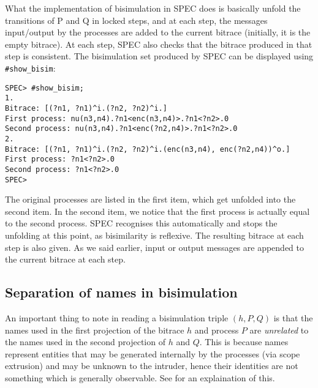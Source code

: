 \documentclass{article}
\begin{document}
What the implementation of bisimulation in SPEC does is basically
unfold the transitions of P and Q in locked steps, and at each step, the 
messages input/output by the processes are added to the current bitrace (initially,
it is the empty bitrace). At each step, SPEC also checks that the bitrace produced
in that step is consistent. 
The bisimulation set produced by SPEC can be displayed using \texttt{\#show\_bisim}:
\begin{verbatim}
SPEC> #show_bisim;
1. 
Bitrace: [(?n1, ?n1)^i.(?n2, ?n2)^i.]
First process: nu(n3,n4).?n1<enc(n3,n4)>.?n1<?n2>.0
Second process: nu(n3,n4).?n1<enc(?n2,n4)>.?n1<?n2>.0
2. 
Bitrace: [(?n1, ?n1)^i.(?n2, ?n2)^i.(enc(n3,n4), enc(?n2,n4))^o.]
First process: ?n1<?n2>.0
Second process: ?n1<?n2>.0
SPEC>
\end{verbatim}
The original processes are listed in the first item, which get unfolded into the second
item. In the second item, we notice that the first process is actually equal to the second
process. SPEC recognises this automatically and stops the unfolding at this point, as 
bisimilarity is reflexive. 
The resulting bitrace at each step is also given.
As we said earlier, input or output messages are appended to the current bitrace at each
step. 

\subsection{Separation of names in bisimulation}

An important thing to note in reading a bisimulation triple $(h,P,Q)$ is that
the names used in the first projection of the bitrace $h$
and process $P$ are {\em unrelated} to the names used in the second projection of $h$
and $Q$. This is because names represent entities that may be generated internally
by the processes (via scope extrusion) and may be unknown to the intruder, hence their
identities are not something which is generally observable. 
See \cite{abadi98njc} for an explaination of this. 
\end{document}
